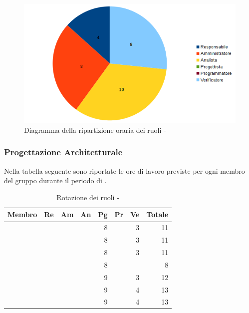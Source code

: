 \documentclass[12pt,a4paper]{article}
\begin{document}
\begin{center}
	\begin{figure}[H]
		\centering \includegraphics[width=\textwidth]{../img/diagrammaTortaAnalisiDiDettaglioTotaleOre.png}
		\caption{Diagramma della ripartizione oraria dei ruoli - \FAD{}}
	\end{figure}
\end{center}

\newpage
\subsubsection{Progettazione Architetturale}

Nella tabella seguente sono riportate le ore di lavoro previste per ogni membro del gruppo durante il periodo di \FP.

\begin{table}[H]
	\begin{center}
		\begin{tabular}{l r r r r r r r}
			\toprule
			\textbf{Membro}	&	\textbf{Re}	&	\textbf{Am}	& \textbf{An} & \textbf{Pg} & \textbf{Pr} & \textbf{Ve} & \textbf{Totale}\\
			\midrule
			\midrule
			\IB{} & & & & 8 & & 3 & 11 \\
			\midrule
			\AB{} & & & & 8 & & 3 & 11 \\
			\midrule
			\NDC{} & & & & 8 & & 3 & 11 \\
			\midrule
			\TP{} & & & & 8 & & & 8 \\
			\midrule
			\WS{} & & & & 9 & & 3 & 12 \\
			\midrule
			\AVE{} & & & & 9 & & 4 & 13 \\
			\midrule
			\AVI{} & & & & 9 & & 4 & 13 \\
			\bottomrule
		\end{tabular}
		\caption{Rotazione dei ruoli - \FPA{}}
	\end{center}
\end{table}
\end{document}
